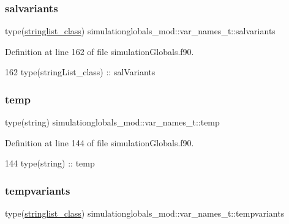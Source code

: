 \subsubsection{\texorpdfstring{salvariants}{salvariants}}
{\footnotesize\ttfamily type(\mbox{\hyperlink{structsimulationglobals__mod_1_1stringlist__class}{stringlist\+\_\+class}}) simulationglobals\+\_\+mod\+::var\+\_\+names\+\_\+t\+::salvariants\hspace{0.3cm}{\ttfamily [private]}}



Definition at line 162 of file simulation\+Globals.\+f90.


\begin{DoxyCode}
162         \textcolor{keywordtype}{type}(stringList\_class) :: salVariants
\end{DoxyCode}
\mbox{\label{structsimulationglobals__mod_1_1var__names__t_a2b8a91d6d50fa1312daa7b33447a1f23}} 
\subsubsection{\texorpdfstring{temp}{temp}}
{\footnotesize\ttfamily type(string) simulationglobals\+\_\+mod\+::var\+\_\+names\+\_\+t\+::temp\hspace{0.3cm}{\ttfamily [private]}}



Definition at line 144 of file simulation\+Globals.\+f90.


\begin{DoxyCode}
144         \textcolor{keywordtype}{type}(string) :: temp
\end{DoxyCode}
\mbox{\label{structsimulationglobals__mod_1_1var__names__t_ac8683baed9dc7b78e48128ebc1df9fe3}} 
\subsubsection{\texorpdfstring{tempvariants}{tempvariants}}
{\footnotesize\ttfamily type(\mbox{\hyperlink{structsimulationglobals__mod_1_1stringlist__class}{stringlist\+\_\+class}}) simulationglobals\+\_\+mod\+::var\+\_\+names\+\_\+t\+::tempvariants\hspace{0.3cm}{\ttfamily [private]}}



